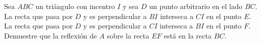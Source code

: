 Sea $ABC$ un triángulo con incentro $I$ y sea $D$ un punto arbitrario en el lado $BC$. La
recta que pasa por $D$ y es perpendicular a $BI$ interseca a $CI$ en el punto $E$. La recta que pasa por $D$
y es perpendicular a $CI$ interseca a $BI$ en el punto $F$. Demuestre que la reflexión de $A$ sobre la recta
$EF$ está en la recta $BC$.